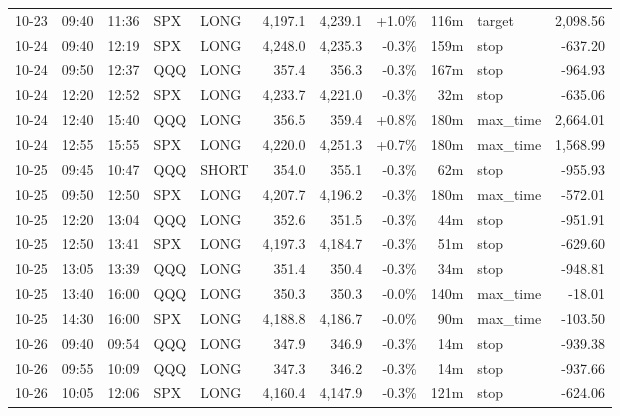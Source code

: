 \documentclass[11pt,a4paper,twoside]{article}
\begin{document}
\begin{center}
\begin{longtable}{>{\color{txtmain}}l l l l l r r r r >{\color{txtmain}}l r}
10-23 & 09:40 & 11:36 & SPX & LONG & 4,197.1 & 4,239.1 & \textcolor{wingreen}{+1.0\%} & 116m & target & \textcolor{wingreen}{2,098.56} \\
10-24 & 09:40 & 12:19 & SPX & LONG & 4,248.0 & 4,235.3 & \textcolor{lossred}{-0.3\%} & 159m & stop & \textcolor{lossred}{-637.20} \\
10-24 & 09:50 & 12:37 & QQQ & LONG & 357.4 & 356.3 & \textcolor{lossred}{-0.3\%} & 167m & stop & \textcolor{lossred}{-964.93} \\
10-24 & 12:20 & 12:52 & SPX & LONG & 4,233.7 & 4,221.0 & \textcolor{lossred}{-0.3\%} & 32m & stop & \textcolor{lossred}{-635.06} \\
10-24 & 12:40 & 15:40 & QQQ & LONG & 356.5 & 359.4 & \textcolor{wingreen}{+0.8\%} & 180m & max\_time & \textcolor{wingreen}{2,664.01} \\
10-24 & 12:55 & 15:55 & SPX & LONG & 4,220.0 & 4,251.3 & \textcolor{wingreen}{+0.7\%} & 180m & max\_time & \textcolor{wingreen}{1,568.99} \\
10-25 & 09:45 & 10:47 & QQQ & SHORT & 354.0 & 355.1 & \textcolor{lossred}{-0.3\%} & 62m & stop & \textcolor{lossred}{-955.93} \\
10-25 & 09:50 & 12:50 & SPX & LONG & 4,207.7 & 4,196.2 & \textcolor{lossred}{-0.3\%} & 180m & max\_time & \textcolor{lossred}{-572.01} \\
10-25 & 12:20 & 13:04 & QQQ & LONG & 352.6 & 351.5 & \textcolor{lossred}{-0.3\%} & 44m & stop & \textcolor{lossred}{-951.91} \\
10-25 & 12:50 & 13:41 & SPX & LONG & 4,197.3 & 4,184.7 & \textcolor{lossred}{-0.3\%} & 51m & stop & \textcolor{lossred}{-629.60} \\
10-25 & 13:05 & 13:39 & QQQ & LONG & 351.4 & 350.4 & \textcolor{lossred}{-0.3\%} & 34m & stop & \textcolor{lossred}{-948.81} \\
10-25 & 13:40 & 16:00 & QQQ & LONG & 350.3 & 350.3 & \textcolor{lossred}{-0.0\%} & 140m & max\_time & \textcolor{lossred}{-18.01} \\
10-25 & 14:30 & 16:00 & SPX & LONG & 4,188.8 & 4,186.7 & \textcolor{lossred}{-0.0\%} & 90m & max\_time & \textcolor{lossred}{-103.50} \\
10-26 & 09:40 & 09:54 & QQQ & LONG & 347.9 & 346.9 & \textcolor{lossred}{-0.3\%} & 14m & stop & \textcolor{lossred}{-939.38} \\
10-26 & 09:55 & 10:09 & QQQ & LONG & 347.3 & 346.2 & \textcolor{lossred}{-0.3\%} & 14m & stop & \textcolor{lossred}{-937.66} \\
10-26 & 10:05 & 12:06 & SPX & LONG & 4,160.4 & 4,147.9 & \textcolor{lossred}{-0.3\%} & 121m & stop & \textcolor{lossred}{-624.06} \\

\end{longtable}
\end{center}
\end{document}
